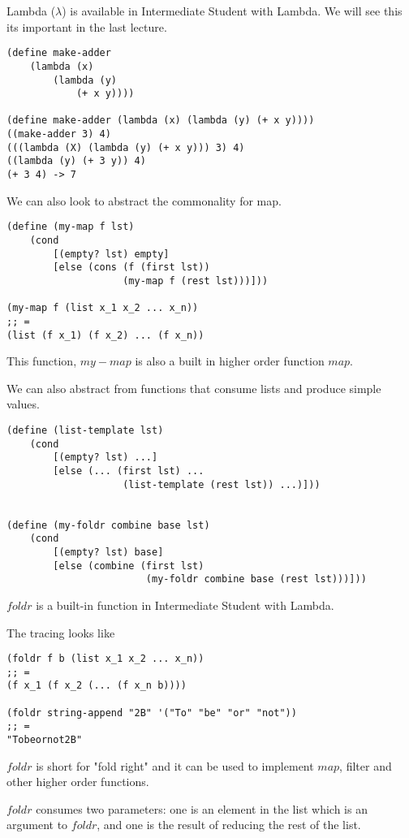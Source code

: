 \documentclass{article}
\begin{document}
Lambda ($\lambda$) is available in Intermediate Student with Lambda. We will see this its important in the last lecture. 

\begin{lstlisting}
(define make-adder
    (lambda (x)
        (lambda (y)
            (+ x y))))

(define make-adder (lambda (x) (lambda (y) (+ x y))))
((make-adder 3) 4)
(((lambda (X) (lambda (y) (+ x y))) 3) 4)
((lambda (y) (+ 3 y)) 4)
(+ 3 4) -> 7
\end{lstlisting}


We can also look to abstract the commonality for map. 
\begin{lstlisting}
(define (my-map f lst)
    (cond
        [(empty? lst) empty]
        [else (cons (f (first lst))
                    (my-map f (rest lst)))]))

(my-map f (list x_1 x_2 ... x_n))
;; =
(list (f x_1) (f x_2) ... (f x_n))
\end{lstlisting}

This function, $my-map$ is also a built in higher order function $map$. 

We can also abstract from functions that consume lists and produce simple values. 

\begin{lstlisting}
(define (list-template lst)
    (cond
        [(empty? lst) ...]
        [else (... (first lst) ...
                    (list-template (rest lst)) ...)]))


(define (my-foldr combine base lst)
    (cond
        [(empty? lst) base]
        [else (combine (first lst)
                        (my-foldr combine base (rest lst)))]))
\end{lstlisting}

$foldr$ is a built-in function in Intermediate Student with Lambda. 

The tracing looks like

\begin{lstlisting}
(foldr f b (list x_1 x_2 ... x_n))
;; = 
(f x_1 (f x_2 (... (f x_n b))))

(foldr string-append "2B" '("To" "be" "or" "not"))
;; = 
"Tobeornot2B"
\end{lstlisting}

$foldr$ is short for "fold right" and it can be used to implement $map$, filter and other higher order functions. 

$foldr$ consumes two parameters: one is an element in the list which is an argument to $foldr$, and one is the result of reducing the rest of the list. 
\end{document}
